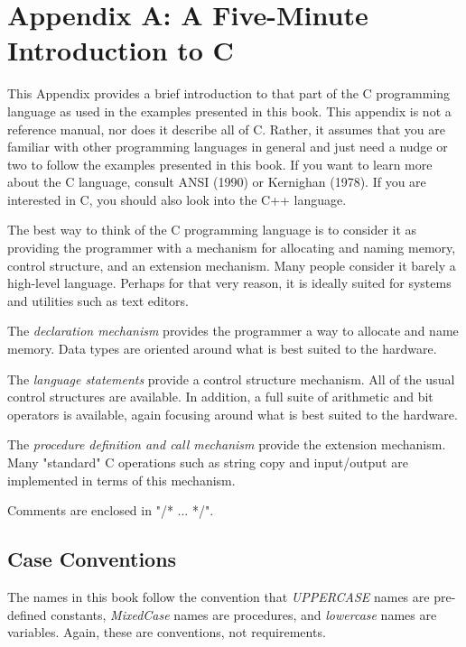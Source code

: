 \chapter{Appendix A: A Five-Minute Introduction to C}
\par
This Appendix provides a brief introduction to that part of the C programming %
language as used in the examples presented in this book. This appendix %
is not a reference manual, nor does it describe all of C. Rather, it %
assumes that you are familiar with other programming languages in general %
and just need a nudge or two to follow the examples presented in this %
book. If you want to learn more about the C language, consult ANSI %
(1990) or Kernighan (1978). If you are interested in C, you should %
also look into the C++ language. %
\par
The best way to think of the C programming language is to consider %
it as providing the programmer with a mechanism for allocating and %
naming memory, control structure, and an extension mechanism. Many %
people consider it barely a high-level language. Perhaps for that very %
reason, it is ideally suited for systems and utilities such as text %
editors. %
\par
The {\it declaration mechanism} provides the programmer a way to allocate %
and name memory. Data types are oriented around what is best suited %
to the hardware. %
\par
The {\it language statements} provide a control structure mechanism. %
 All of the usual control structures are available. In addition, a %
full suite of arithmetic and bit operators is available, again focusing %
around what is best suited to the hardware. %
\par
The {\it procedure definition and call mechanism} provide the extension %
mechanism. Many "standard" C operations such as string copy and input/output %
are implemented in terms of this mechanism. %
\par
Comments are enclosed in "/* ... */". %
\section{Case Conventions}
\par
The names in this book follow the convention that {\it UPPERCASE} names %
are pre-defined constants, {\it MixedCase} names are procedures, and %
{\it lowercase} names are variables. Again, these are conventions, %
not requirements. %
